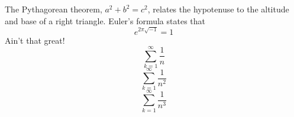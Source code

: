 The Pythagorean theorem, $a^2 + b^2 = c^2$,
relates the hypotenuse to the altitude
and base of a right triangle.
Euler’s formula states that
\[
e^{2\pi \sqrt{-1}} = 1
\]
Ain’t that great!
\begin{equation*}
\sum_{k=1}^\infty \frac{1}{n}
\end{equation*}
\begin{equation}\label{hoho}
\sum_{k=1}^\infty \frac{1}{n^2}
\end{equation}
\begin{equation}
\sum_{k=1}^\infty \frac{1}{n^3}
\end{equation}
